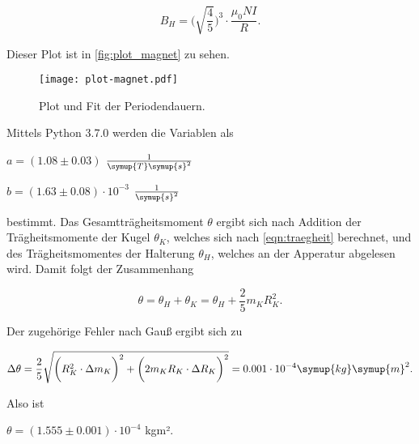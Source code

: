 \begin{equation}
    B_H = \bigg( \sqrt{\frac{4}{5}} \bigg)^3 \cdot \frac{\mu_0 N I}{R}.
\end{equation}

Dieser Plot ist in \autoref{fig:plot_magnet} zu sehen.

\begin{figure}
  \centering
  \texttt{[image: plot-magnet.pdf]}
  \caption{Plot und Fit der Periodendauern.}
  \label{fig:plot_magnet}
\end{figure}

Mittels Python 3.7.0 werden die Variablen als

\vspace{.5em}
\centerline{$a = (1.08 \pm 0.03)$ $\frac{1}{\symup{T} \symup{s}^2}$}

\centerline{$b = (1.63 \pm 0.08) \cdot 10^{-3}$ $\frac{1}{\symup{s}^2}$}
\vspace{.5em}

bestimmt. Das Gesamtträgheitsmoment $\theta$ ergibt sich nach Addition der Trägheitsmomente der Kugel $\theta_K$, welches sich nach \eqref{eqn:traegheit} berechnet, und des Trägheitsmomentes der Halterung $\theta_H$, welches an der Apperatur abgelesen wird.
Damit folgt der Zusammenhang

\begin{equation}
  \theta = \theta_H + \theta_K = \theta_H + \frac {2}{5} m_K R_K^{2}.
\end{equation}

Der zugehörige Fehler nach Gauß ergibt sich zu

\begin{equation}
  \Delta \theta = \frac{2}{5} \sqrt{ \bigg( R_K^2 \cdot \Delta m_K \bigg)^2 + \bigg( 2m_K R_K \cdot \Delta R_K \bigg)^2 } = 0.001 \cdot 10^{-4} \symup{kg} \symup{m}^2.
\end{equation}

Also ist

\vspace{.5em}
\centerline{$\theta = (1.555 \pm 0.001) \cdot 10^{-4}$ kgm².}
\vspace{.5em}
